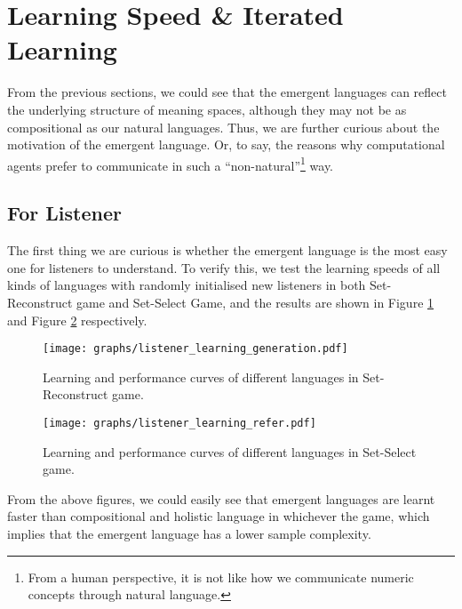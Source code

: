 
\section{Learning Speed \& Iterated Learning}
\label{sec4.3:learning_speed}

From the previous sections, we could see that the emergent languages can reflect the underlying structure of meaning spaces, although they may not be as compositional as our natural languages. Thus, we are further curious about the motivation of the emergent language. Or, to say, the reasons why computational agents prefer to communicate in such a ``non-natural''\footnote{From a human perspective, it is not like how we communicate numeric concepts through natural language.} way.

\subsection{For Listener}
\label{ssec4.3.1:learning_listener}

The first thing we are curious is whether the emergent language is the most easy one for listeners to understand. To verify this, we test the learning speeds of all kinds of languages with randomly initialised new listeners in both Set-Reconstruct game and Set-Select Game, and the results are shown in Figure \ref{fig4.1:listener_learning_generation} and Figure \ref{fig4.2:listener_learning_refer} respectively.

\begin{figure}[!h]
    \centering
    \texttt{[image: graphs/listener\_learning\_generation.pdf]}
    \caption{Learning and performance curves of different languages in Set-Reconstruct game.}
    \label{fig4.1:listener_learning_generation}
\end{figure}

\begin{figure}[!h]
    \centering
    \texttt{[image: graphs/listener\_learning\_refer.pdf]}
    \caption{Learning and performance curves of different languages in Set-Select game.}
    \label{fig4.2:listener_learning_refer}
\end{figure}

From the above figures, we could easily see that emergent languages are learnt faster than compositional and holistic language in whichever the game, which implies that the emergent language has a lower sample complexity\cite{vapnik2013nature}.

